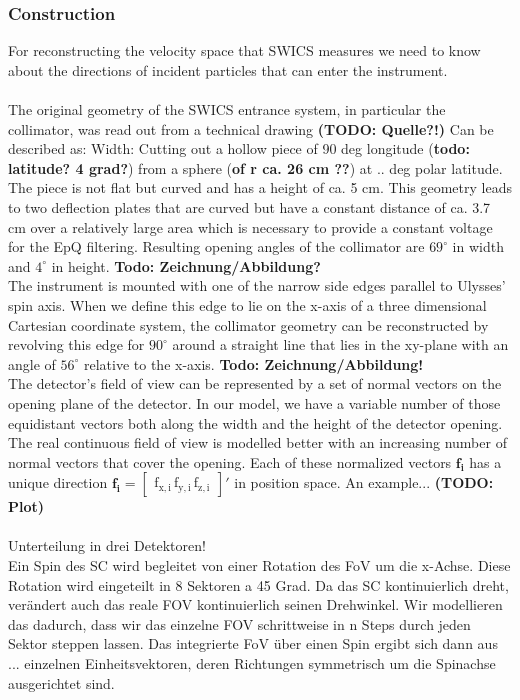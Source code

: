 \subsubsection{Construction}
For reconstructing the velocity space that SWICS measures we need to know about the directions of incident particles that can enter the instrument.
\\ \\
The original geometry of the SWICS entrance system, in particular the collimator, was read out from a technical drawing \textbf{\textbf{(TODO: Quelle?!})}
Can be described as:
Width: Cutting out a hollow piece of 90 deg longitude (\textbf{todo: latitude? 4 grad?}) from a sphere (\textbf{of r ca. 26 cm ??}) at .. deg polar latitude. The piece is not flat but curved and has a height of ca. 5 cm. This geometry leads to two deflection plates that are curved but have a constant distance of ca. 3.7 cm over a relatively large area which is necessary to provide a constant voltage for the EpQ filtering. Resulting opening angles of the collimator are $69^\circ$ in width and $4^\circ$ in height. \textbf{Todo: Zeichnung/Abbildung?}\\
The instrument is mounted with one of the narrow side edges parallel to Ulysses' spin axis. When we define this edge to lie on the x-axis of a three dimensional Cartesian coordinate system, the collimator geometry can be reconstructed by revolving this edge for $90^\circ$ around a straight line that lies in the xy-plane with an angle of $56^\circ$ relative to the x-axis. \textbf{Todo: Zeichnung/Abbildung!} \\
The detector's field of view can be represented by a set of normal vectors on the opening plane of the detector. In our model, we have a variable number of those equidistant vectors both along the width and the height of the detector opening. The real continuous field of view is modelled better with an increasing number of normal vectors that cover the opening. Each of these normalized vectors $\mathrm{\mathbf{f_i}}$ has a unique direction $\mathrm{\mathbf{f_i} = \begin{bmatrix}f_{x,i}\,f_{y,i}\,f_{z,i}\end{bmatrix}}'$ in position space. An example... \textbf{(TODO: Plot)}
\\ \\
Unterteilung in drei Detektoren!\\
Ein Spin des SC wird begleitet von einer Rotation des FoV um die x-Achse. Diese Rotation wird eingeteilt in 8 Sektoren a 45 Grad. Da das SC kontinuierlich dreht, verändert auch das reale FOV kontinuierlich seinen Drehwinkel. Wir modellieren das dadurch, dass wir das einzelne FOV schrittweise in n Steps durch jeden Sektor steppen lassen.
Das integrierte FoV über einen Spin ergibt sich dann aus ... einzelnen Einheitsvektoren, deren Richtungen symmetrisch um die Spinachse ausgerichtet sind.

